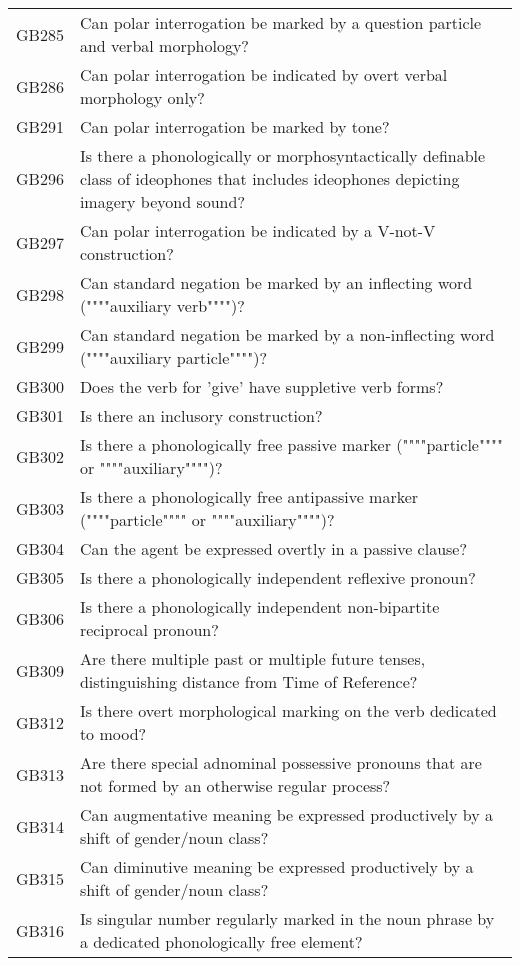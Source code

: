 \begin{longtable}{p{3cm}p{12cm}}
  GB285 & Can polar interrogation be marked by a question particle and verbal morphology? \\ 
  GB286 & Can polar interrogation be indicated by overt verbal morphology only? \\ 
  GB291 & Can polar interrogation be marked by tone? \\ 
  GB296 & Is there a phonologically or morphosyntactically definable class of ideophones that includes ideophones depicting imagery beyond sound? \\ 
  GB297 & Can polar interrogation be indicated by a V-not-V construction? \\ 
  GB298 & Can standard negation be marked by an inflecting word (""""auxiliary verb"""")? \\ 
  GB299 & Can standard negation be marked by a non-inflecting word (""""auxiliary particle"""")? \\ 
  GB300 & Does the verb for 'give' have suppletive verb forms? \\ 
  GB301 & Is there an inclusory construction? \\ 
  GB302 & Is there a phonologically free passive marker (""""particle"""" or """"auxiliary"""")? \\ 
  GB303 & Is there a phonologically free antipassive marker (""""particle"""" or """"auxiliary"""")? \\ 
  GB304 & Can the agent be expressed overtly in a passive clause? \\ 
  GB305 & Is there a phonologically independent reflexive pronoun? \\ 
  GB306 & Is there a phonologically independent non-bipartite reciprocal pronoun? \\ 
  GB309 & Are there multiple past or multiple future tenses, distinguishing distance from Time of Reference? \\ 
  GB312 & Is there overt morphological marking on the verb dedicated to mood? \\ 
  GB313 & Are there special adnominal possessive pronouns that are not formed by an otherwise regular process? \\ 
  GB314 & Can augmentative meaning be expressed productively by a shift of gender/noun class? \\ 
  GB315 & Can diminutive meaning be expressed productively by a shift of gender/noun class? \\ 
  GB316 & Is singular number regularly marked in the noun phrase by a dedicated phonologically free element? \\ 

\end{longtable}
